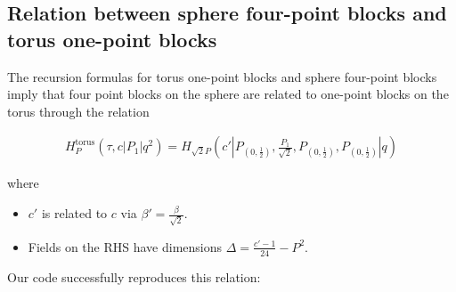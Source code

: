 \documentclass[a4paper]{article}
\numberwithin{equation}{section}
\begin{document}
\subsection{Relation between sphere four-point blocks and torus one-point blocks}
\label{sec:orgdc5cddc}
The recursion formulas for torus one-point blocks and sphere four-point blocks imply that four point blocks on the sphere are related to one-point blocks on the torus through the relation

\begin{align}
H^{\text{torus}}_{P}(\tau, c | P_{1} | q^{2}) = H_{\sqrt{2}P}\left(c' \left|\left. P_{(0,\frac12)}, \frac{P_{1}}{\sqrt{2}}, P_{(0,\frac12)}, P_{(0,\frac12)} \right.\right| q \right)
\end{align}

where
\begin{itemize}
\item \(c'\) is related to \(c\) via \(\beta'=\frac\beta{\sqrt 2}\).
\item Fields on the RHS have dimensions \(\Delta = \frac{c'-1}{24} - P^2\).
\end{itemize}

Our code successfully reproduces this relation:
\end{document}
